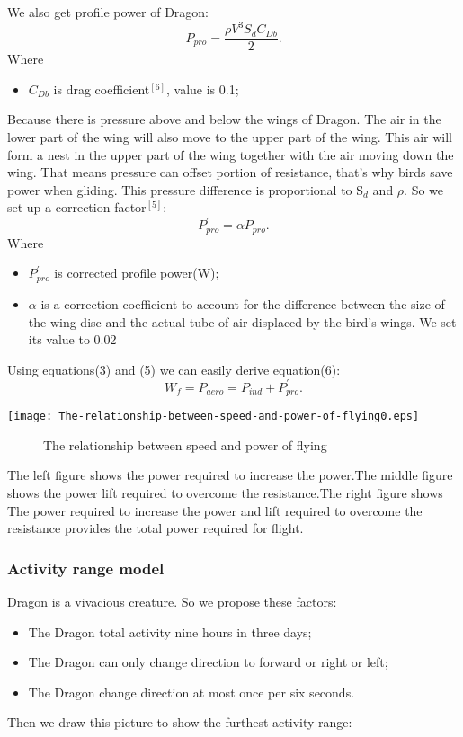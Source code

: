 \documentclass[12pt]{article}
\begin{document}
We also get profile power of Dragon:
\begin{equation}
	P_{pro}=\frac{\rho V^3S_dC_{Db}}{2}.	%
\end{equation}
Where
\begin{itemize}
    \item $C_{Db}$ is drag coefficient$^{[6]}$, value is 0.1;
\end{itemize}

Because there is pressure above and below the wings of Dragon. The air in the lower part of the wing will also move to the upper part of the wing. This air will form a nest in the upper part of the wing together with the air moving down the wing. That means pressure can offset portion of resistance, that's why birds save power when gliding. This pressure difference is proportional to S$_d$ and $\rho$. So we set up a correction factor$^{[5]}$:
\begin{equation}
	P_{pro}^{'}=\alpha P_{pro}.	%
\end{equation}
Where
\begin{itemize}
    \item $P_{pro}^{'}$ is corrected profile power(W);
	 \item $\alpha$ is a correction coefficient to account for the difference between the size of the wing disc and the actual tube of air displaced by the bird's wings. We set its value to 0.02
\end{itemize}

Using equations(3) and (5) we can easily derive equation(6):
\begin{equation}
	W_f=P_{aero}=P_{ind} + P_{pro}^{'}.	%
\end{equation}


\centerline{\texttt{[image: The-relationship-between-speed-and-power-of-flying0.eps]}}%
\begin{figure}[!htbp]
    \small
    \caption{The relationship between speed and power of flying}\label{jj}
\end{figure}
The left figure shows the power required to increase the power.The middle figure shows the power lift required to overcome the resistance.The right figure shows The power required to increase the power and lift required to overcome the resistance provides the total power required for flight.


\subsubsection{Activity range model}%
Dragon is a vivacious creature. So we propose these factors:
\begin{itemize}
    \item The Dragon total activity nine hours in three days;
	 \item The Dragon can only change direction to forward or right or left;
	 \item The Dragon change direction at most once per six seconds.
\end{itemize}
Then we draw this picture to show the furthest activity range:
\end{document}
